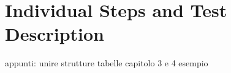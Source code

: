 \newpage
\section{Individual Steps and Test Description}

appunti: unire strutture tabelle capitolo 3 e 4 esempio